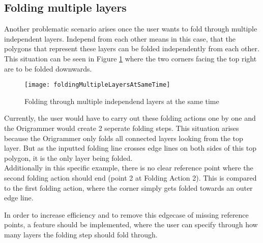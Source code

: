 \subsection{Folding multiple layers}

Another problematic scenario arises once the user wants to fold through multiple independent layers. Independ from each other means in this case, that the polygons that represent these layers can be folded independently from each other. This situation can be seen in Figure \ref{fig:foldingMultipleLayersAtSameTime} where the two corners facing the top right are to be folded downwards. 

\begin{figure}[htbp]
	\centering
	\texttt{[image: foldingMultipleLayersAtSameTime]}
	\caption{Folding through multiple independend layers at the same time}
	\label{fig:foldingMultipleLayersAtSameTime}
\end{figure}

\noindent Currently, the user would have to carry out these folding actions one by one and the Origrammer would create 2 seperate folding steps. This situation arises because the Origrammer only folds all connected layers looking from the top layer. But as the inputted folding line crosses edge lines on both sides of this top polygon, it is the only layer being folded.\\
Additionally in this specific example, there is no clear reference point where the second folding action should end (point 2 at Folding Action 2). This is compared to the first folding action, where the corner simply gets folded towards an outer edge line.


\noindent In order to increase efficiency and to remove this edgecase of missing reference points, a feature should be implemented, where the user can specify through how many layers the folding step should fold through.%
